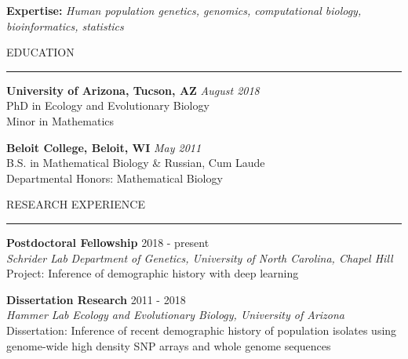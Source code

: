\documentclass{resume} %
\renewenvironment{rSection}[1]{
\sectionskip
\textcolor{RoyalPurple}{\MakeUppercase{#1}}
\sectionlineskip
\hrule
\begin{list}{}{
\setlength{\leftmargin}{1.5em}
}
\item[]
}{
\end{list}
}
\begin{document}

\textcolor{RoyalPurple}{\bf Expertise:}
\textcolor{RoyalPurple}{\em Human population genetics, genomics, computational biology, bioinformatics, statistics}

\begin{rSection}{Education}

{\bf University of Arizona, Tucson, AZ} \hfill {\em August 2018} \\ 
PhD in Ecology and Evolutionary Biology \\
Minor in Mathematics 

{\bf Beloit College, Beloit, WI} \hfill {\em May 2011} \\ 
B.S. in Mathematical Biology \& Russian, Cum Laude \\
Departmental Honors: Mathematical Biology

\end{rSection}


\begin{rSection}{Research Experience}

{\bf Postdoctoral Fellowship} \hfill  2018 - present\\ 
{\em Schrider Lab} \hfill {\em Department of Genetics, University of North Carolina, Chapel Hill}\\
Project: Inference of demographic history with deep learning

{\bf Dissertation Research} \hfill  2011 - 2018\\ 
{\em Hammer Lab} \hfill {\em Ecology and Evolutionary Biology, University of Arizona}\\
Dissertation: Inference of recent demographic history of population isolates using genome-wide high density SNP arrays and whole genome sequences

\end{rSection}

\end{document}
